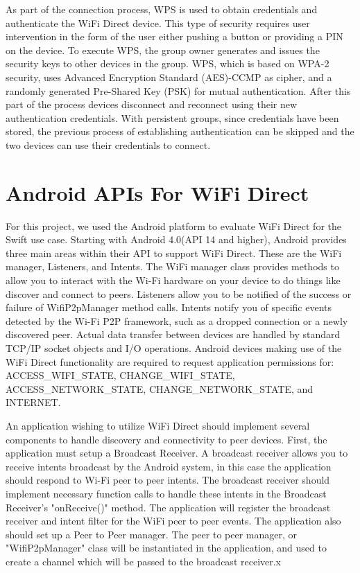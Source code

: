 \documentclass[10pt,twocolumn]{article}
\begin{document}
As part of the connection process, WPS is used to obtain credentials and authenticate the WiFi Direct device.  
This type of security requires user intervention in the form of the user either pushing a button or providing a PIN on the device.
To execute WPS, the group owner generates and issues the security keys to other devices in the group. 
WPS, which is based on WPA-2 security, uses Advanced Encryption Standard (AES)-CCMP as cipher, and a randomly generated Pre-Shared Key (PSK) for mutual authentication\cite{wifiwhitepaper}.
After this part of the process devices disconnect and reconnect using their new authentication credentials.
With persistent groups, since credentials have been stored, the previous process of establishing authentication can be skipped and the two devices can use their credentials to connect.

\section{Android APIs For WiFi Direct}
\label{sec:Android APIs For WiFi Direct}
For this project, we used the Android platform to evaluate WiFi Direct for the Swift use case.
Starting with Android 4.0(API 14 and higher), Android provides three main areas within their API to support WiFi Direct.
These are the WiFi manager, Listeners, and Intents.
The WiFi manager class provides methods to allow you to interact with the Wi-Fi hardware on your device to do things like discover and connect to peers. 
Listeners allow you to be notified of the success or failure of WifiP2pManager method calls. 
Intents notify you of specific events detected by the Wi-Fi P2P framework, such as a dropped connection or a newly discovered peer. 
Actual data transfer between devices are handled by standard TCP/IP socket objects and I/O operations.
Android devices making use of the WiFi Direct functionality are required to request application permissions for: ACCESS\_WIFI\_STATE, CHANGE\_WIFI\_STATE, ACCESS\_NETWORK\_STATE, CHANGE\_NETWORK\_STATE, and INTERNET. \cite{androidoverview}

An application wishing to utilize WiFi Direct should implement several components to handle discovery and connectivity to peer devices.
First, the application must setup a Broadcast Receiver. 
A broadcast receiver allows you to receive intents broadcast by the Android system, in this case the application should respond to Wi-Fi peer to peer intents.
The broadcast receiver should implement necessary function calls to handle these intents in the Broadcast Receiver's "onReceive()" method.
The application will register the broadcast receiver and intent filter for the WiFi peer to peer events.
The application also should set up a Peer to Peer manager. 
The peer to peer manager, or "WifiP2pManager" class will be instantiated in the application, and used to create a channel which will be passed to the broadcast receiver.x
\end{document}
